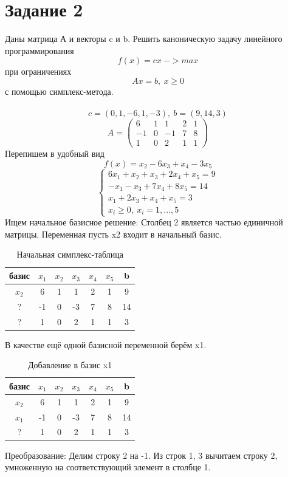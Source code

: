 \documentclass{article}
\begin{document}
\section*{Задание 2}
Даны матрица А и векторы c и b. Решить каноническую задачу линейного программирования
\[f(x) = cx \ -> max\]
при ограничениях
\[Ax = b,\ x\geq 0\]
с помощью симплекс-метода.
\\ \\
\[c = (0, 1, -6, 1, -3),\ b = (9, 14, 3)\]
\[A = \begin{pmatrix}
    6&1&1&2&1\\
    -1&0&-1&7&8\\
    1&0&2&1&1
\end{pmatrix}\]
Перепишем в удобный вид
\[f(x) = x_2-6x_3+x_4-3x_5\]
\[\begin{cases}
    6x_1+x_2+x_3+2x_4+x_5 = 9\\
    -x_1-x_3+7x_4+8x_5 = 14\\
    x_1+2x_3+x_4+x_5 = 3\\
    x_i \geq 0,\ x_i = 1, ..., 5
\end{cases}\]
Ищем начальное базисное решение:
Столбец 2 является частью единичной матрицы. Переменная пусть x2 входит в начальный базис.
\begin{table}[H]
    \centering
    \caption{Начальная симплекс-таблица}
    \begin{tabular}{|c|c|c|c|c|c|c|}
    \hline
        базис & $x_1$ & $x_2$ & $x_3$ & $x_4$ & $x_5$ & b \\ \hline
        $x_2$ & 6 & 1 & 1 & 2 & 1 & 9 \\
        ? & -1 & 0 & -3 & 7 & 8 & 14 \\
        ? & 1 & 0 & 2 & 1 & 1 & 3 \\ \hline
    \end{tabular}
\end{table}
В качестве ещё одной базисной переменной берём x1. 

\begin{table}[H]
    \centering
    \caption{Добавление в базис x1}
    \begin{tabular}{|c|c|c|c|c|c|c|}
    \hline
        базис & $x_1$ & $x_2$ & $x_3$ & $x_4$ & $x_5$ & b \\ \hline
        $x_2$ & 6&	1	&1	&2	&1&	9 \\
        $x_1$ & -1&	0&	-3&	7	&8&	14 \\
        ? & 1	&0	&2	&1&	1&	3 \\ \hline
    \end{tabular}
\end{table}
Преобразование: Делим строку 2 на -1. Из строк 1, 3 вычитаем строку 2, умноженную на соответствующий элемент в столбце 1.
\end{document}

